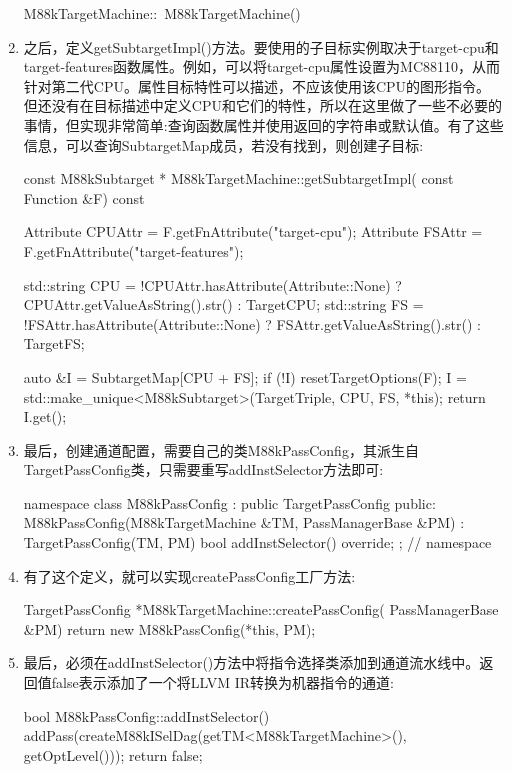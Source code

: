 \begin{enumerate}
\begin{cpp}
M88kTargetMachine::~M88kTargetMachine() {}
\end{cpp}

\item
之后，定义getSubtargetImpl()方法。要使用的子目标实例取决于target-cpu和target-features函数属性。例如，可以将target-cpu属性设置为MC88110，从而针对第二代CPU。属性目标特性可以描述，不应该使用该CPU的图形指令。但还没有在目标描述中定义CPU和它们的特性，所以在这里做了一些不必要的事情，但实现非常简单:查询函数属性并使用返回的字符串或默认值。有了这些信息，可以查询SubtargetMap成员，若没有找到，则创建子目标:

\begin{cpp}
const M88kSubtarget *
M88kTargetMachine::getSubtargetImpl(
        const Function &F) const {
    Attribute CPUAttr = F.getFnAttribute("target-cpu");
    Attribute FSAttr =
        F.getFnAttribute("target-features");

    std::string CPU =
        !CPUAttr.hasAttribute(Attribute::None)
            ? CPUAttr.getValueAsString().str()
            : TargetCPU;
    std::string FS = !FSAttr.hasAttribute(Attribute::None)
                        ? FSAttr.getValueAsString().str()
                        : TargetFS;

    auto &I = SubtargetMap[CPU + FS];
    if (!I) {
        resetTargetOptions(F);
        I = std::make_unique<M88kSubtarget>(TargetTriple,
                                            CPU, FS, *this);
    }
    return I.get();
}
\end{cpp}

\item
最后，创建通道配置，需要自己的类M88kPassConfig，其派生自TargetPassConfig类，只需要重写addInstSelector方法即可:

\begin{cpp}
namespace {
class M88kPassConfig : public TargetPassConfig {
    public:
    M88kPassConfig(M88kTargetMachine &TM,
                   PassManagerBase &PM)
        : TargetPassConfig(TM, PM) {}
    bool addInstSelector() override;
};
} // namespace
\end{cpp}

\item
有了这个定义，就可以实现createPassConfig工厂方法:

\begin{cpp}
TargetPassConfig *M88kTargetMachine::createPassConfig(
        PassManagerBase &PM) {
    return new M88kPassConfig(*this, PM);
}
\end{cpp}

\item
最后，必须在addInstSelector()方法中将指令选择类添加到通道流水线中。返回值false表示添加了一个将LLVM IR转换为机器指令的通道:

\begin{cpp}
bool M88kPassConfig::addInstSelector() {
        addPass(createM88kISelDag(getTM<M88kTargetMachine>(),
                                  getOptLevel()));
    return false;
}
\end{cpp}
\end{enumerate}

